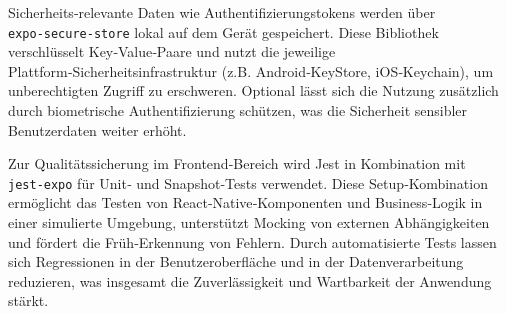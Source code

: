 Sicherheits‑relevante Daten wie Authentifizierungstokens werden über \texttt{expo‑secure‑store} lokal auf dem Gerät gespeichert. Diese Bibliothek verschlüsselt Key‑Value‑Paare und nutzt die jeweilige Plattform‑Sicherheitsinfrastruktur (z.B. Android‑KeyStore, iOS‑Keychain), um unberechtigten Zugriff zu erschweren. Optional lässt sich die Nutzung zusätzlich durch biometrische Authentifizierung schützen, was die Sicherheit sensibler Benutzerdaten weiter erhöht.

Zur Qualitätssicherung im Frontend‑Bereich wird Jest in Kombination mit \texttt{jest‑expo} für Unit‑ und Snapshot‑Tests verwendet. Diese Setup‑Kombination ermöglicht das Testen von React‑Native‑Komponenten und Business‑Logik in einer simulierte Umgebung, unterstützt Mocking von externen Abhängigkeiten und fördert die Früh‑Erkennung von Fehlern. Durch automatisierte Tests lassen sich Regressionen in der Benutzeroberfläche und in der Datenverarbeitung reduzieren, was insgesamt die Zuverlässigkeit und Wartbarkeit der Anwendung stärkt. 